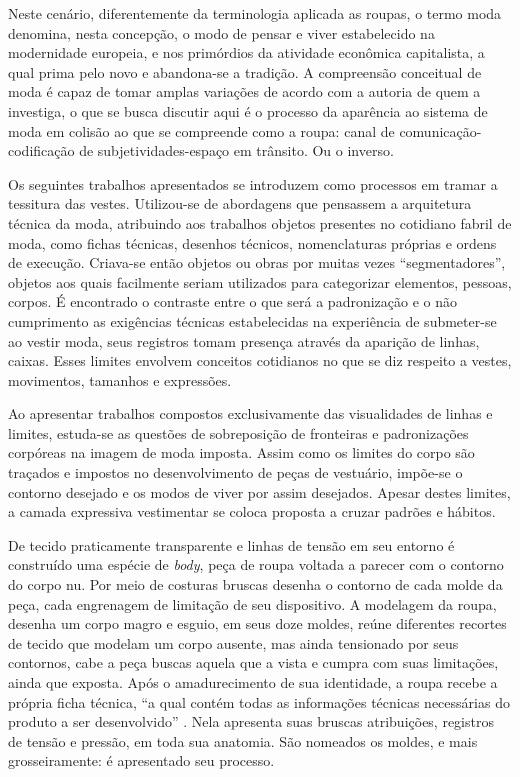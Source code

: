 \begin{refsection}
    Neste cenário, diferentemente da terminologia aplicada as roupas, o termo moda denomina, nesta concepção, o modo de pensar e viver estabelecido na modernidade europeia, e nos primórdios da atividade econômica capitalista, a qual prima pelo novo e abandona-se a tradição. A compreensão conceitual de moda é capaz de tomar amplas variações de acordo com a autoria de quem a investiga, o que se busca discutir aqui é o processo da aparência ao sistema de moda em colisão ao que se compreende como a roupa: canal de comunicação-codificação de subjetividades-espaço em trânsito. Ou o inverso. 

    Os seguintes trabalhos apresentados se introduzem como processos em tramar a tessitura das vestes. Utilizou-se de abordagens que pensassem a arquitetura técnica da moda, atribuindo aos trabalhos objetos presentes no cotidiano fabril de moda, como fichas técnicas, desenhos técnicos, nomenclaturas próprias e ordens de execução. Criava-se então objetos ou obras por muitas vezes ``segmentadores'', objetos aos quais facilmente seriam utilizados para categorizar elementos, pessoas, corpos. É encontrado o contraste entre o que será a padronização e o não cumprimento as exigências técnicas estabelecidas na experiência de submeter-se ao vestir moda, seus registros tomam presença através da aparição de linhas, caixas. Esses limites envolvem conceitos cotidianos no que se diz respeito a vestes, movimentos, tamanhos e expressões. 

    Ao apresentar trabalhos compostos exclusivamente das visualidades de linhas e limites, estuda-se as questões de sobreposição de fronteiras e padronizações corpóreas na imagem de moda imposta. Assim como os limites do corpo são traçados e impostos no desenvolvimento de peças de vestuário, impõe-se o contorno desejado e os modos de viver por assim desejados. Apesar destes limites, a camada expressiva vestimentar se coloca proposta a cruzar padrões e hábitos. 

    De tecido praticamente transparente e linhas de tensão em seu entorno é construído uma espécie de \textit{body}, peça de roupa voltada a parecer com o contorno do corpo nu. Por meio de costuras bruscas desenha o contorno de cada molde da peça, cada engrenagem de limitação de seu dispositivo. A modelagem da roupa, desenha um corpo magro e esguio, em seus doze moldes, reúne diferentes recortes de tecido que modelam um corpo ausente, mas ainda tensionado por seus contornos, cabe a peça buscas aquela que a vista e cumpra com suas limitações, ainda que exposta. Após o amadurecimento de sua identidade, a roupa recebe a própria ficha técnica, ``a qual contém todas as informações técnicas necessárias do produto a ser desenvolvido'' \cite{Pires2014Ficha}. Nela apresenta suas bruscas atribuições, registros de tensão e pressão, em toda sua anatomia. São nomeados os moldes, e mais grosseiramente: é apresentado seu processo.


\end{refsection}
